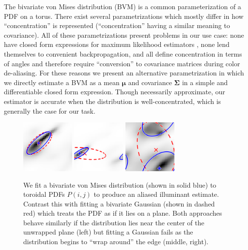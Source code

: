 \documentclass[10pt,twocolumn,letterpaper]{article}
\begin{document}
The bivariate von Mises distribution (BVM) is a common parameterization of a
PDF on a torus.
There exist several parametrizations
which mostly differ in how ``concentration'' is represented
(``concentration'' having a similar meaning to covariance).
All of these parametrizations present problems in our use case:
none have closed form expressions for maximum likelihood estimators \cite{Hamelryck2012},
none lend themselves to convenient backpropagation,
and all define concentration in terms of angles and therefore
require ``conversion'' to covariance matrices during color de-aliasing.
For these reasons we present an alternative parametrization in which we directly
estimate a BVM as a mean $\boldsymbol{\mu}$ and covariance $\boldsymbol{\Sigma}$
in a simple and differentiable closed form expression.
Though necessarily approximate,
our estimator is accurate when the distribution is well-concentrated,
which is generally the case for our task.

\begin{figure}[!]
\centering
  \includegraphics[width=1.05in]{figures/vonmises/0047.png}
  \includegraphics[width=1.05in]{figures/vonmises/0029.png}
  \includegraphics[width=1.05in]{figures/vonmises/0042.png}
  \caption{
  We fit a bivariate von Mises distribution (shown in
  solid blue) to toroidal PDFs $P(i,j)$ to produce an aliased illuminant estimate.
  Contrast this with fitting a bivariate Gaussian (shown in dashed red)
  which treats the PDF as if it lies on a plane.
  Both approaches behave similarly if the distribution lies near the center of the
  unwrapped plane (left) but fitting a Gaussian fails as the distribution begins
  to ``wrap around'' the edge (middle, right).
  \label{fig:vonmises}
  }
\end{figure}
\end{document}
